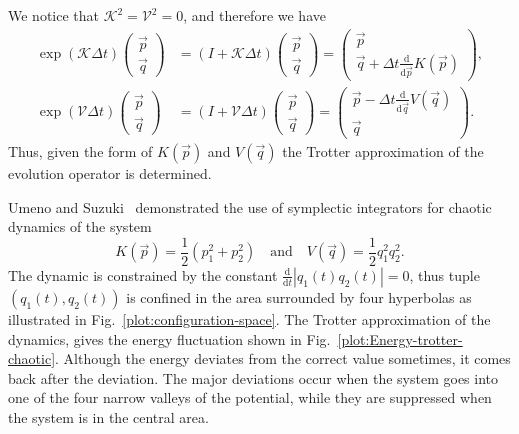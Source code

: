 We notice that $\mathcal{K}^2 = \mathcal{V}^2 = 0$, and therefore we have
\begin{align}
\exp \left( \mathcal{K} \Delta t \right) \left( \begin{matrix}
\vec{p} \\ \vec{q}
\end{matrix} \right)
&=
(I+\mathcal{K}\Delta t) \left( \begin{matrix}
\vec{p} \\ \vec{q}
\end{matrix} \right)
=
\left( \begin{matrix}
\vec{p} \\ \vec{q} + \Delta t \frac{\mathrm{d}}{\mathrm{d} \vec{p}} K(\vec{p})
\end{matrix} \right), \\
\exp \left( \mathcal{V} \Delta t \right) \left( \begin{matrix}
\vec{p} \\ \vec{q}
\end{matrix} \right)
&= (I+\mathcal{V}\Delta t) \left( \begin{matrix}
\vec{p} \\ \vec{q}
\end{matrix} \right)
=
\left( \begin{matrix}
\vec{p} - \Delta t \frac{\mathrm{d}}{\mathrm{d} \vec{q}} V(\vec{q}) \\ \vec{q} 
\end{matrix} \right).
\end{align}
Thus, given the form of $K(\vec{p})$ and $V(\vec{q})$ the Trotter approximation of the evolution operator is determined.

Umeno and Suzuki~\citep{US93,SU93} demonstrated the use of symplectic integrators for chaotic dynamics of the system
\begin{equation}
K(\vec{p}) = \frac{1}{2} (p_1^2 + p_2^2) \quad \mathrm{and} \quad V(\vec{q}) = \frac{1}{2} 	q_1^2 q_2^2.
\end{equation}
The dynamic is constrained by the constant $\frac{\mathrm{d}}{\mathrm{d} t} |q_1(t) q_2(t)| = 0$, thus tuple $(q_1(t), q_2(t))$ is confined in the area surrounded by four hyperbolas as illustrated in Fig.~\ref{plot:configuration-space}. The Trotter approximation of the dynamics, gives  the energy fluctuation shown in Fig.~\ref{plot:Energy-trotter-chaotic}. Although the energy deviates from the correct value sometimes, it comes back after the deviation. The major deviations occur when the system goes into one of the four narrow valleys of the potential, while they are suppressed when the system is in the central area.

